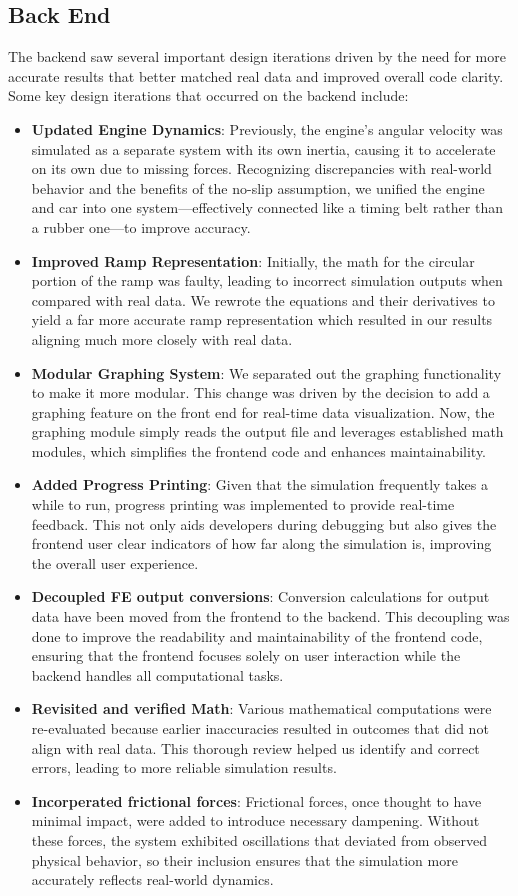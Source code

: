 \documentclass{article}
\begin{document}
\subsection{Back End}
\noindent The backend saw several important design iterations driven by the need for more accurate results that better matched real data and improved overall code clarity. Some key design iterations that occurred on the backend include:

\begin{itemize}
    \item \textbf{Updated Engine Dynamics}: Previously, the engine's angular velocity was simulated as a separate system with its own inertia, causing it to accelerate on its own due to missing forces. Recognizing discrepancies with real-world behavior and the benefits of the no-slip assumption, we unified the engine and car into one system—effectively connected like a timing belt rather than a rubber one—to improve accuracy.
    \item \textbf{Improved Ramp Representation}: Initially, the math for the circular portion of the ramp was faulty, leading to incorrect simulation outputs when compared with real data. We rewrote the equations and their derivatives to yield a far more accurate ramp representation which resulted in our results aligning much more closely with real data.
    \item \textbf{ Modular Graphing System}: We separated out the graphing functionality to make it more modular. This change was driven by the decision to add a graphing feature on the front end for real-time data visualization. Now, the graphing module simply reads the output file and leverages established math modules, which simplifies the frontend code and enhances maintainability.
    \item \textbf{Added Progress Printing}: Given that the simulation frequently takes a while to run, progress printing was implemented to provide real-time feedback. This not only aids developers during debugging but also gives the frontend user clear indicators of how far along the simulation is, improving the overall user experience.
    \item \textbf{Decoupled FE output conversions}: Conversion calculations for output data have been moved from the frontend to the backend. This decoupling was done to improve the readability and maintainability of the frontend code, ensuring that the frontend focuses solely on user interaction while the backend handles all computational tasks.
    \item \textbf{Revisited and verified Math}: Various mathematical computations were re-evaluated because earlier inaccuracies resulted in outcomes that did not align with real data. This thorough review helped us identify and correct errors, leading to more reliable simulation results.
    \item \textbf{Incorperated frictional forces}: Frictional forces, once thought to have minimal impact, were added to introduce necessary dampening. Without these forces, the system exhibited oscillations that deviated from observed physical behavior, so their inclusion ensures that the simulation more accurately reflects real-world dynamics.
\end{itemize}
\end{document}
